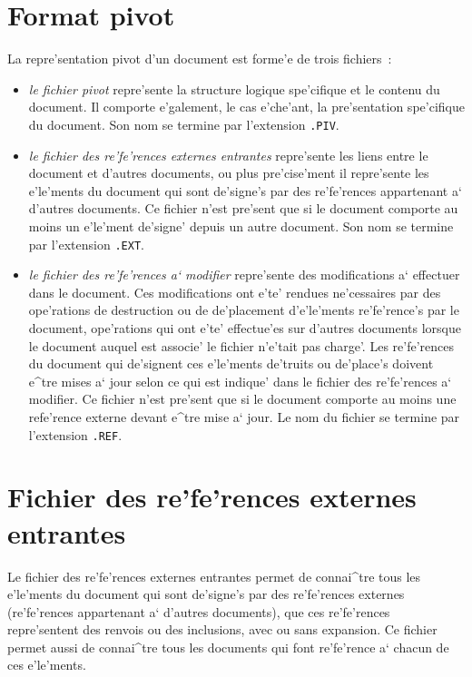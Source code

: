 \section{Format pivot}

La repre'sentation pivot d'un document est forme'e de trois fichiers~:

\begin{itemize}
\item
{\it le fichier pivot} repre'sente la structure logique spe'cifique
et le contenu du document. Il comporte e'galement, le cas e'che'ant,
la pre'sentation spe'cifique du document. Son nom se termine par l'extension
{\tt .PIV}.

\item
{\it le fichier des re'fe'rences externes entrantes} repre'sente les liens
entre le document et d'autres documents, ou plus pre'cise'ment il repre'sente
les e'le'ments du document qui sont de'signe's par des re'fe'rences
appartenant a` d'autres documents. Ce fichier n'est pre'sent que si le
document comporte au moins un e'le'ment de'signe' depuis un autre document.
Son nom se termine par l'extension {\tt .EXT}.

\item
{\it le fichier des re'fe'rences a` modifier} repre'sente des modifications
a` effectuer dans le document. Ces modifications ont e'te' rendues
ne'cessaires par des ope'rations de destruction ou de de'placement
d'e'le'ments re'fe'rence's par le document, ope'rations
qui ont e'te' effectue'es sur d'autres documents lorsque le document auquel
est associe' le fichier n'e'tait pas charge'.
Les re'fe'rences du document qui de'signent ces e'le'ments de'truits ou
de'place's doivent e^tre mises a` jour selon ce qui est indique' dans le
fichier des re'fe'rences a` modifier.
Ce fichier n'est pre'sent que si le document comporte au moins une
refe'rence externe devant e^tre mise a` jour.
Le nom du fichier se termine par l'extension {\tt .REF}.
\end{itemize}

\section{Fichier des re'fe'rences externes entrantes}

Le fichier des re'fe'rences externes entrantes permet de connai^tre tous les
e'le'ments du document qui sont de'signe's par des re'fe'rences externes
(re'fe'rences appartenant a` d'autres documents), que ces re'fe'rences
repre'sentent des renvois ou des inclusions, avec ou sans expansion. Ce
fichier permet aussi de connai^tre tous les documents qui font re'fe'rence
a` chacun de ces e'le'ments.

